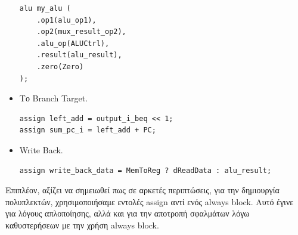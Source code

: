 \documentclass[a4paper,12pt]{report}
\def\tl{\textlatin}
\begin{document}
\begin{itemize}
            \vspace{0.5cm}
            \begin{lstlisting}[style=verilog]
alu my_alu (
	.op1(alu_op1),
    .op2(mux_result_op2),
    .alu_op(ALUCtrl),
    .result(alu_result),
	.zero(Zero)
);
            \end{lstlisting}
        \item Το \tl{Branch Target}.
            \begin{lstlisting}[style=verilog]
assign left_add = output_i_beq << 1;
assign sum_pc_i = left_add + PC;
            \end{lstlisting}
        \item \tl{Write Back}.
            \begin{lstlisting}[style=verilog]
assign write_back_data = MemToReg ? dReadData : alu_result;
            \end{lstlisting}
    \end{itemize}
    \newpage
    Επιπλέον, αξίζει να σημειωθεί πως σε αρκετές περιπτώσεις, για την δημιουργία πολυπλεκτών, χρησιμοποιήσαμε εντολές \tl{assign} αντί ενός \tl{always block}. Αυτό έγινε για λόγους απλοποίησης, αλλά και για την αποτροπή σφαλμάτων λόγω καθυστερήσεων με την χρήση \tl{always block}.
    \vspace{0.5 cm}
    \begin{figure}[h!]
        \centering
        \caption{}
    \end{figure}
\end{document}
